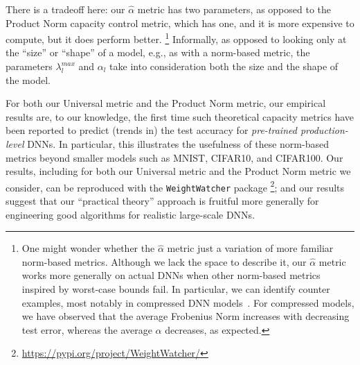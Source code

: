 There is a tradeoff here: our $\hat{\alpha}$ metric has two parameters, as opposed to the Product Norm capacity control metric, which has one, and it is more expensive to compute, but it does perform better.%
\footnote{One might wonder whether the $\hat{\alpha}$ metric just a variation of more familiar norm-based metrics.  Although we lack the space to describe it, our $\hat{\alpha}$ metric works more generally on actual DNNs when other norm-based metrics inspired by worst-case bounds fail.  In particular, we can identify counter examples, most notably in compressed DNN models~\cite{CWZZ17_TR}.  For compressed models, we have observed that the average Frobenius Norm increases with decreasing test error, whereas the average $\alpha$ decreases, as expected.}
Informally, as opposed to looking only at the ``size'' or ``shape'' of a model, e.g., as with a norm-based metric, the parameters $\lambda_{l}^{max}$ and $\alpha_{l}$ take into consideration both the size and the shape of the model.

For both our Universal metric and the Product Norm metric, our empirical results are, to our knowledge, the first time such theoretical capacity metrics have been reported to predict (trends in) the test accuracy for \emph{pre-trained production-level} DNNs.
In particular, this illustrates the usefulness of these norm-based metrics beyond smaller models such as MNIST, CIFAR10, and CIFAR100. 
Our 
results, including for both our Universal metric and the Product Norm metric we consider, can be reproduced with the \texttt{WeightWatcher} package%
\footnote{\url{https://pypi.org/project/WeightWatcher/}};
and our
results suggest that our ``practical theory'' approach is fruitful more generally for engineering good algorithms for realistic large-scale DNNs.


